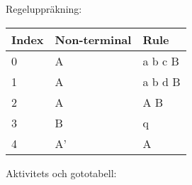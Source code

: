 \documentclass[10pt, titlepage, oneside, a4paper]{article}
\begin{document}
	Regeluppräkning:	
	
	\begin{center}
		\begin{table}[h!]
		\begin{tabular}{ | l | l | l | }
		\hline
		\textbf{Index} & \textbf{Non-terminal} & \textbf{Rule} \\ \hline
	0 & A &a b c B \\
	1 & A &a b d B\\
	2 & A &A B\\
	3 & B & q\\
	4 & A' & A\\
		\hline
		\end{tabular}
		\end{table}
		\end{center}
	
	
	Aktivitets och gototabell:	
	
\end{document}
